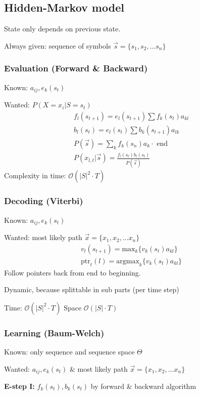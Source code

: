 \documentclass[main]{subfiles}
\begin{document}
\begin{landscape}
\begin{multicols}{4}
{\color{subsectionColor}\subsection{Hidden-Markov model}}
State only depends on previous state.

Always given: sequence of symbols $\vec{s} = \{s_1,s_2, \ldots s_n\}$
{\color{subsubsectionColor}\subsubsection{Evaluation (Forward \& Backward)}}
Known: $a_{ij}, e_k(s_t)$

Wanted: $P(X = x_i | S = s_t)$
\begin{eqnarray}
f_l (s_{t+1}) = e_l(s_{t+1}) \sum f_k(s_t) a_{kl} \\
b_l(s_t) = e_l(s_t) \sum b_k(s_{t+1}) a_{lk} \\
P(\vec{s}) = \sum_k f_k(s_n) a_k \cdot \text{ end} \\
P(x_{l,t} | \vec{s}) = \frac{f_l(s_t) b_l(s_t)}{P(\vec{s})}
\end{eqnarray}
Complexity in time: $\mathcal{O}(|S|^2 \cdot T)$

{\color{subsubsectionColor}\subsubsection{Decoding (Viterbi)}}
Known: $a_{ij}, e_k(s_t)$

Wanted: most likely path $\vec{x} = \{x_1,x_2,\ldots x_n\}$
\begin{eqnarray}
v_l(s_{t+1}) = \text{max}_k \{ v_k(s_t) a_{kl} \} \\
\text{ptr}_t(l) = \text{argmax}_k \{ v_k(s_t) a_{kl} \}
\end{eqnarray}
Follow pointers back from end to beginning.

Dynamic, because splittable in sub parts (per time step)

Time: $\mathcal{O}(|S|^2 \cdot T)$
Space $\mathcal{O}(|S| \cdot T)$

{\color{subsubsectionColor}\subsubsection{Learning (Baum-Welch)}}
Known: only sequence and sequence space $\Theta$

Wanted: $a_{ij}, e_k(s_t)$ \& most likely path $\vec{x} = \{x_1,x_2,\ldots x_n\}$

\textbf{E-step I:} $f_k(s_t), b_k(s_t)$ by forward \& backward algorithm


\end{multicols}
\end{landscape}
\end{document}
